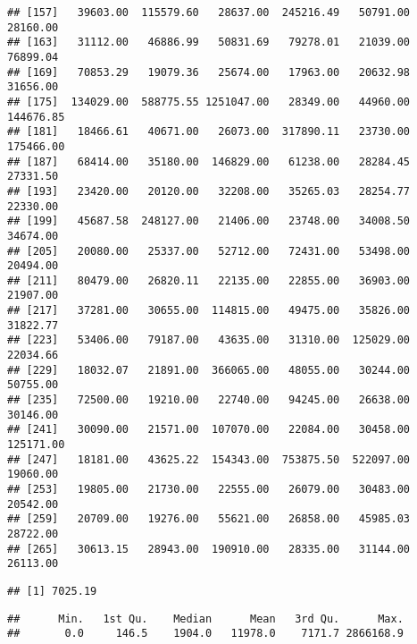 \documentclass[
]{article}
\newenvironment{Shaded}{\begin{snugshade}}{\end{snugshade}}
\newcommand{\KeywordTok}[1]{\textcolor[rgb]{0.13,0.29,0.53}{\textbf{#1}}}
\newcommand{\NormalTok}[1]{#1}
\newcommand{\OperatorTok}[1]{\textcolor[rgb]{0.81,0.36,0.00}{\textbf{#1}}}
\begin{document}
\begin{verbatim}
## [157]   39603.00  115579.60   28637.00  245216.49   50791.00   28160.00
## [163]   31112.00   46886.99   50831.69   79278.01   21039.00   76899.04
## [169]   70853.29   19079.36   25674.00   17963.00   20632.98   31656.00
## [175]  134029.00  588775.55 1251047.00   28349.00   44960.00  144676.85
## [181]   18466.61   40671.00   26073.00  317890.11   23730.00  175466.00
## [187]   68414.00   35180.00  146829.00   61238.00   28284.45   27331.50
## [193]   23420.00   20120.00   32208.00   35265.03   28254.77   22330.00
## [199]   45687.58  248127.00   21406.00   23748.00   34008.50   34674.00
## [205]   20080.00   25337.00   52712.00   72431.00   53498.00   20494.00
## [211]   80479.00   26820.11   22135.00   22855.00   36903.00   21907.00
## [217]   37281.00   30655.00  114815.00   49475.00   35826.00   31822.77
## [223]   53406.00   79187.00   43635.00   31310.00  125029.00   22034.66
## [229]   18032.07   21891.00  366065.00   48055.00   30244.00   50755.00
## [235]   72500.00   19210.00   22740.00   94245.00   26638.00   30146.00
## [241]   30090.00   21571.00  107070.00   22084.00   30458.00  125171.00
## [247]   18181.00   43625.22  154343.00  753875.50  522097.00   19060.00
## [253]   19805.00   21730.00   22555.00   26079.00   30483.00   20542.00
## [259]   20709.00   19276.00   55621.00   26858.00   45985.03   28722.00
## [265]   30613.15   28943.00  190910.00   28335.00   31144.00   26113.00
\end{verbatim}

\begin{Shaded}
\end{Shaded}

\begin{verbatim}
## [1] 7025.19
\end{verbatim}

\begin{Shaded}
\end{Shaded}

\begin{verbatim}
##      Min.   1st Qu.    Median      Mean   3rd Qu.      Max. 
##       0.0     146.5    1904.0   11978.0    7171.7 2866168.9
\end{verbatim}
\end{document}
